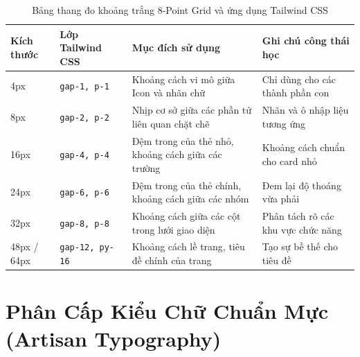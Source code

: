 \documentclass[a4paper,11pt]{article}
\begin{document}
\begin{table}[htbp]
\centering
\small
\caption{Bảng thang đo khoảng trắng 8-Point Grid và ứng dụng Tailwind CSS}
\vspace{0.5em}
\begin{tabularx}{\textwidth}{L{2.5cm} L{3cm} L{4.5cm} Y}
\toprule
\textbf{Kích thước} & \textbf{Lớp Tailwind CSS} & \textbf{Mục đích sử dụng} & \textbf{Ghi chú công thái học} \\
\midrule
4px & \texttt{gap-1, p-1} & Khoảng cách vi mô giữa Icon và nhãn chữ & Chỉ dùng cho các thành phần con \\
8px & \texttt{gap-2, p-2} & Nhịp cơ sở giữa các phần tử liên quan chặt chẽ & Nhãn và ô nhập liệu tương ứng \\
16px & \texttt{gap-4, p-4} & Đệm trong của thẻ nhỏ, khoảng cách giữa các trường & Khoảng cách chuẩn cho card nhỏ \\
24px & \texttt{gap-6, p-6} & Đệm trong của thẻ chính, khoảng cách giữa các nhóm & Đem lại độ thoáng vừa phải \\
32px & \texttt{gap-8, p-8} & Khoảng cách giữa các cột trong lưới giao diện & Phân tách rõ các khu vực chức năng \\
48px / 64px & \texttt{gap-12, py-16} & Khoảng cách lề trang, tiêu đề chính của trang & Tạo sự bề thế cho tiêu đề \\
\bottomrule
\end{tabularx}
\end{table}

\section{Phân Cấp Kiểu Chữ Chuẩn Mực (Artisan Typography)}
\end{document}
